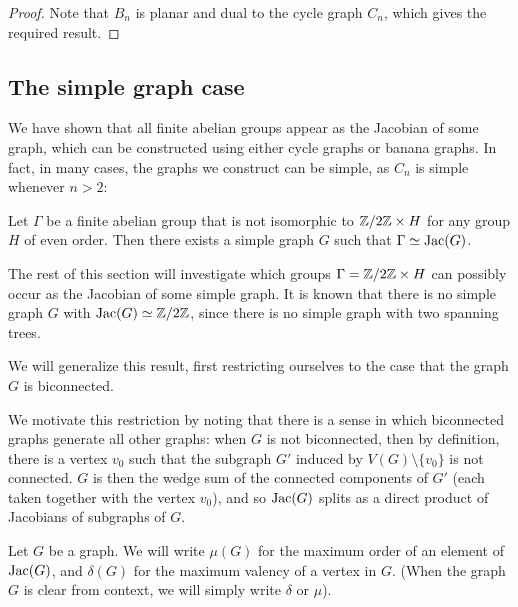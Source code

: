 \documentclass{amsart}
\begin{document}
\begin{proof}
  Note that $B_n$ is planar and dual to the cycle graph $C_n$, which
  gives the required result.
\end{proof}

\subsection{The simple graph case}
We have shown that all finite abelian groups appear as the Jacobian of
some graph, which can be constructed using either cycle graphs or
banana graphs. In fact, in many cases, the graphs we construct can be
simple, as $C_n$ is simple whenever $n > 2$:

\begin{prop}
  Let $\Gamma$ be a finite abelian group that is not isomorphic to
  $\mathbb{Z}/2\mathbb{Z} \times H$ for any group $H$ of even order. Then there exists
  a simple graph $G$ such that $\Gamma \simeq \operatorname{Jac}(G)$.
\end{prop}

The rest of this section will investigate which groups $\Gamma =
\mathbb{Z}/2\mathbb{Z} \times H$ can possibly occur as the Jacobian of some simple
graph. It is known that there is no simple graph $G$ with $\operatorname{Jac}(G)
\simeq \mathbb{Z}/2\mathbb{Z}$, since there is no simple graph with two spanning
trees. 

We will generalize this result, first restricting ourselves to the
case that the graph $G$ is biconnected.

\begin{remark}
  \label{remark:biconnected_wedge}
  We motivate this restriction by noting that there is a sense in
  which biconnected graphs generate all other graphs: when $G$ is not
  biconnected, then by definition, there is a vertex $v_0$ such that
  the subgraph $G'$ induced by $V(G) \setminus \{v_0\}$ is not
  connected. $G$ is then the wedge sum of the connected components of
  $G'$ (each taken together with the vertex $v_0$), and so $\operatorname{Jac}(G)$
  splits as a direct product of Jacobians of subgraphs of $G$.
\end{remark}

\begin{defn}
  Let $G$ be a graph. We will write $\mu(G)$ for the maximum order of
  an element of $\operatorname{Jac}(G)$, and $\delta(G)$ for the maximum valency of
  a vertex in $G$. (When the graph $G$ is clear from context, we will
  simply write $\delta$ or $\mu$).
\end{defn}
\end{document}
